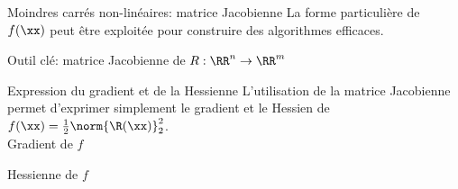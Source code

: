 \documentclass[9pt,table]{beamer} %
\begin{document}
\begin{frame}{Moindres carrés non-linéaires: matrice Jacobienne}
  La forme particulière de $f(\xx)$ peut être exploitée pour construire des algorithmes efficaces. \bigskip


  \alert{Outil clé: matrice Jacobienne de $R: \RR^n \rightarrow \RR^m$}

\end{frame}



\begin{frame}{Expression du gradient et de la Hessienne}
  L'utilisation de la matrice Jacobienne permet d'exprimer simplement le gradient et le Hessien de $f(\xx) = \frac{1}{2}\norm{ \R(\xx)}^2_2$. \\[1em]

  \alert{Gradient de $f$}

  
  \alert{Hessienne de $f$}
\end{frame}
\end{document}
